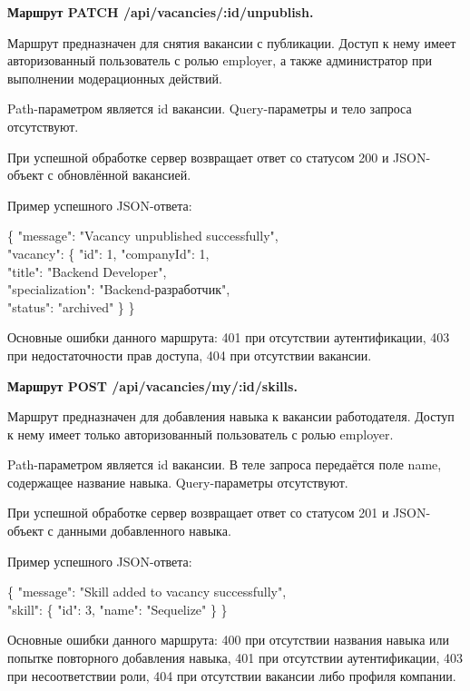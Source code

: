 \textbf{Маршрут PATCH /api/vacancies/:id/unpublish.}

Маршрут предназначен для снятия вакансии с публикации. Доступ к нему имеет авторизованный пользователь с ролью employer, а также администратор при выполнении модерационных действий.

Path-параметром является id вакансии. Query-параметры и тело запроса отсутствуют.

При успешной обработке сервер возвращает ответ со статусом 200 и JSON-объект с обновлённой вакансией.

Пример успешного JSON-ответа:

\begin{flushleft}
	\small\ttfamily
	\{ "message": "Vacancy unpublished successfully",\\
	"vacancy": \{ "id": 1, "companyId": 1,\\
	"title": "Backend Developer",\\
	"specialization": "Backend-разработчик",\\
	"status": "archived" \} \}
\end{flushleft}

Основные ошибки данного маршрута: 401 при отсутствии аутентификации, 403 при недостаточности прав доступа, 404 при отсутствии вакансии.

\textbf{Маршрут POST /api/vacancies/my/:id/skills.}

Маршрут предназначен для добавления навыка к вакансии работодателя. Доступ к нему имеет только авторизованный пользователь с ролью employer.

Path-параметром является id вакансии. В теле запроса передаётся поле name, содержащее название навыка. Query-параметры отсутствуют.

При успешной обработке сервер возвращает ответ со статусом 201 и JSON-объект с данными добавленного навыка.

Пример успешного JSON-ответа:

\begin{flushleft}
	\small\ttfamily
	\{ "message": "Skill added to vacancy successfully",\\
	"skill": \{ "id": 3, "name": "Sequelize" \} \}
\end{flushleft}

Основные ошибки данного маршрута: 400 при отсутствии названия навыка или попытке повторного добавления навыка, 401 при отсутствии аутентификации, 403 при несоответствии роли, 404 при отсутствии вакансии либо профиля компании.

